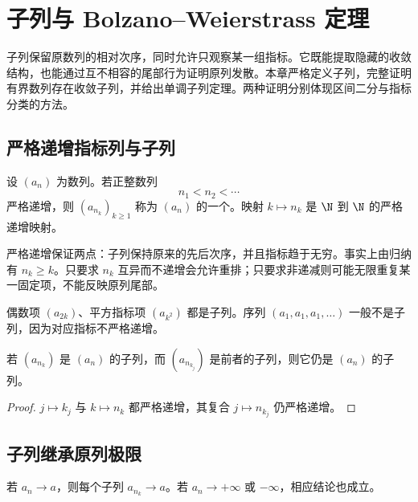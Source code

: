 \chapter{子列与 Bolzano--Weierstrass 定理}
\label{chap:subsequences-bw}

\begin{chapterguide}
子列保留原数列的相对次序，同时允许只观察某一组指标。它既能提取隐藏的收敛结构，也能通过互不相容的尾部行为证明原列发散。本章严格定义子列，完整证明有界数列存在收敛子列，并给出单调子列定理。两种证明分别体现区间二分与指标分类的方法。
\end{chapterguide}

\section{严格递增指标列与子列}

\begin{definition}
设 \((a_n)\) 为数列。若正整数列
\[
 n_1<n_2<\cdots
\]
严格递增，则 \((a_{n_k})_{k\ge1}\) 称为 \((a_n)\) 的一个。映射 \(k\mapsto n_k\) 是 \(\N\) 到 \(\N\) 的严格递增映射。
\end{definition}

严格递增保证两点：子列保持原来的先后次序，并且指标趋于无穷。事实上由归纳有 \(n_k\ge k\)。只要求 \(n_k\) 互异而不递增会允许重排；只要求非递减则可能无限重复某一固定项，不能反映原列尾部。

\begin{example}
偶数项 \((a_{2k})\)、平方指标项 \((a_{k^2})\) 都是子列。序列
\((a_1,a_1,a_1,\ldots)\) 一般不是子列，因为对应指标不严格递增。
\end{example}

\begin{proposition}[子列的子列]
若 \((a_{n_k})\) 是 \((a_n)\) 的子列，而 \((a_{n_{k_j}})\) 是前者的子列，则它仍是 \((a_n)\) 的子列。
\end{proposition}

\begin{proof}
\(j\mapsto k_j\) 与 \(k\mapsto n_k\) 都严格递增，其复合 \(j\mapsto n_{k_j}\) 仍严格递增。
\end{proof}

\section{子列继承原列极限}

\begin{theorem}
若 \(a_n\to a\)，则每个子列 \(a_{n_k}\to a\)。若 \(a_n\to+\infty\) 或 \(-\infty\)，相应结论也成立。
\end{theorem}

